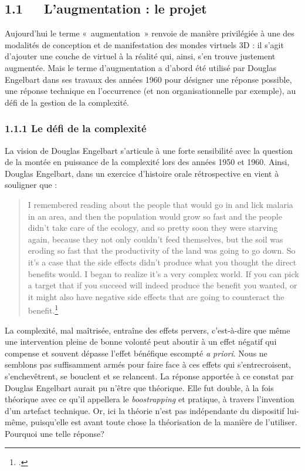 \documentclass{FramateX}
\begin{document}
\begin{refsection}
\subsection*{1.1~~~L'augmentation : le projet}
{}


Aujourd'hui le terme «~augmentation~» renvoie de manière privilégiée à
une des modalités de conception et de manifestation des mondes virtuels
3D : il s'agit d'ajouter une couche de virtuel à la réalité qui, ainsi,
s'en trouve justement augmentée. Mais le terme d'augmentation a d'abord
été utilisé par Douglas Engelbart dans ses travaux des années 1960 pour
désigner une réponse possible, une réponse technique en l'occurrence
(et non organisationnelle par exemple), au défi de la gestion de la
complexité.

\subsubsection*{1.1.1 Le défi de la complexité}
{}

La vision de Douglas Engelbart s'articule à une forte sensibilité avec la
question de la montée en puissance de la complexité lors des années
1950 et 1960. Ainsi, Douglas Engelbart, dans un exercice d'histoire orale
rétrospective en vient à souligner que :
\begin{quote}
I remembered reading about
the people that would go in and lick malaria in an area, and then the
population would grow so fast and the people didn't
take care of the ecology, and so pretty soon they were starving again,
because they not only couldn't feed themselves, but
the soil was eroding so fast that the productivity of the land was
going to go down. So it's a case that the side effects
didn't produce what you thought the direct benefits
would. I began to realize it's a very complex world.
If you can pick a target that if you succeed will indeed produce the
benefit you wanted, or it might also have negative side effects that
are going to counteract the benefit.\footnote{\cite[p.~10]{bardinibootstrapping2001}.}
\end{quote}

 La complexité, mal maîtrisée, entraîne des effets pervers, c'est-à-dire
que même une intervention pleine de bonne volonté peut aboutir à un
effet négatif qui compense et souvent dépasse l'effet bénéfique
escompté \textit{a priori}. Nous ne semblons pas suffisamment armés pour faire
face à ces effets qui s'entrecroisent, s'enchevêtrent, se bouclent et
se relancent. La réponse apportée à ce constat par Douglas Engelbart
aurait pu n'être que théorique. Elle fut double, à la fois théorique
avec ce qu'il appellera le \textit{boostrapping} et pratique, à travers
l'invention d'un artefact technique. Or, ici la théorie n'est pas
indépendante du dispositif lui-même, puisqu'elle est avant toute chose
la théorisation de la manière de l'utiliser. Pourquoi une telle réponse?


\end{refsection}
\end{document}
